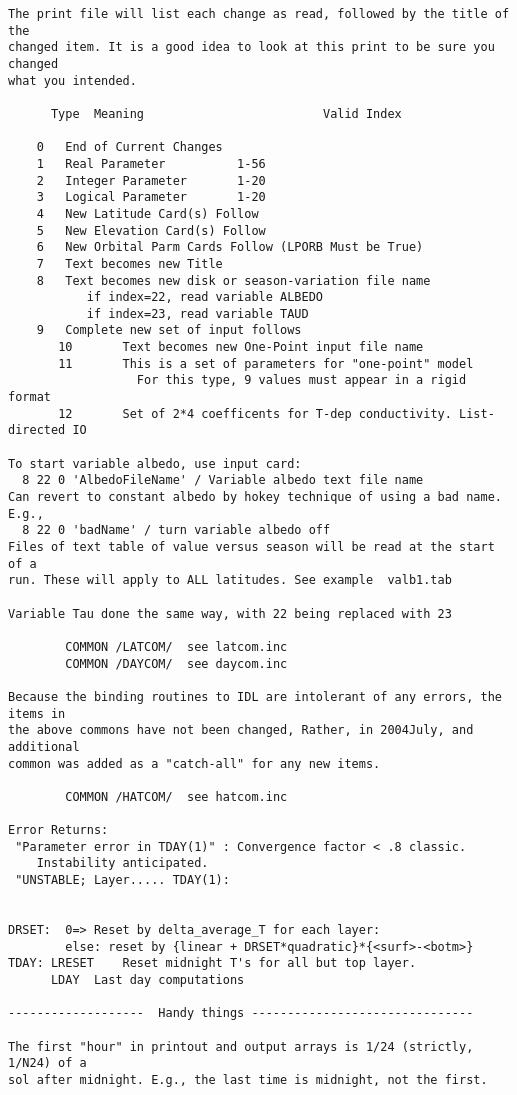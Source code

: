\begin{verbatim}
The print file will list each change as read, followed by the title of the
changed item. It is a good idea to look at this print to be sure you changed
what you intended.

      Type	Meaning                         Valid Index

	0	End of Current Changes
	1	Real Parameter			1-56
	2	Integer Parameter		1-20
	3	Logical Parameter		1-20
	4	New Latitude Card(s) Follow
	5	New Elevation Card(s) Follow
	6	New Orbital Parm Cards Follow (LPORB Must be True)
	7	Text becomes new Title
	8	Text becomes new disk or season-variation file name
		   if index=22, read variable ALBEDO
		   if index=23, read variable TAUD
	9	Complete new set of input follows
       10       Text becomes new One-Point input file name
       11       This is a set of parameters for "one-point" model 
                  For this type, 9 values must appear in a rigid format
       12       Set of 2*4 coefficents for T-dep conductivity. List-directed IO 

To start variable albedo, use input card: 
  8 22 0 'AlbedoFileName' / Variable albedo text file name
Can revert to constant albedo by hokey technique of using a bad name. E.g.,
  8 22 0 'badName' / turn variable albedo off
Files of text table of value versus season will be read at the start of a
run. These will apply to ALL latitudes. See example  valb1.tab
 
Variable Tau done the same way, with 22 being replaced with 23

		COMMON /LATCOM/  see latcom.inc
		COMMON /DAYCOM/  see daycom.inc

Because the binding routines to IDL are intolerant of any errors, the items in
the above commons have not been changed, Rather, in 2004July, and additional
common was added as a "catch-all" for any new items.

		COMMON /HATCOM/  see hatcom.inc

Error Returns:
 "Parameter error in TDAY(1)" : Convergence factor < .8 classic. 
	Instability anticipated.  
 "UNSTABLE; Layer..... TDAY(1): 


DRSET:	0=>	Reset by delta_average_T for each layer:
		else: reset by {linear + DRSET*quadratic}*{<surf>-<botm>}
TDAY: LRESET	Reset midnight T's for all but top layer.
      LDAY	Last day computations

-------------------  Handy things -------------------------------

The first "hour" in printout and output arrays is 1/24 (strictly, 1/N24) of a
sol after midnight. E.g., the last time is midnight, not the first.


\end{verbatim}
